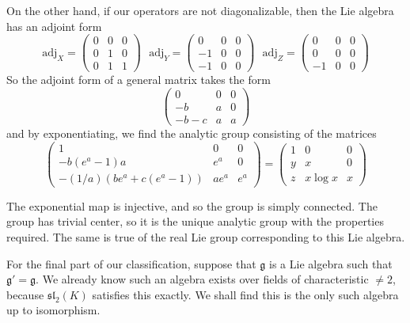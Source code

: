 On the other hand, if our operators are not diagonalizable, then the Lie algebra has an adjoint form
%
\[ \text{adj}_X = \begin{pmatrix} 0 & 0 & 0 \\ 0 & 1 & 0 \\ 0 & 1 & 1 \end{pmatrix}\ \ \ \text{adj}_Y = \begin{pmatrix} 0 & 0 & 0 \\ -1 & 0 & 0 \\ -1 & 0 & 0 \end{pmatrix}\ \ \ \text{adj}_Z = \begin{pmatrix} 0 & 0 & 0 \\ 0 & 0 & 0 \\ -1 & 0 & 0 \end{pmatrix} \]
%
So the adjoint form of a general matrix takes the form
%
\[ \begin{pmatrix} 0 & 0 & 0 \\ -b & a & 0 \\ -b-c & a & a \end{pmatrix} \]
%
and by exponentiating, we find the analytic group consisting of the matrices
%
\[ \begin{pmatrix} 1 & 0 & 0 \\ -b(e^a - 1)a & e^a & 0 \\ -(1/a)(be^a + c(e^a - 1)) & ae^a & e^a \end{pmatrix} = \begin{pmatrix} 1 & 0 & 0 \\ y & x & 0 \\ z & x\log x & x \end{pmatrix} \]

The exponential map is injective, and so the group is simply connected. The group has trivial center, so it is the unique analytic group with the properties required. The same is true of the real Lie group corresponding to this Lie algebra.

For the final part of our classification, suppose that $\mathfrak{g}$ is a Lie algebra such that $\mathfrak{g}' = \mathfrak{g}$. We already know such an algebra exists over fields of characteristic $\neq 2$, because $\mathfrak{sl}_2(K)$ satisfies this exactly. We shall find this is the only such algebra up to isomorphism.

